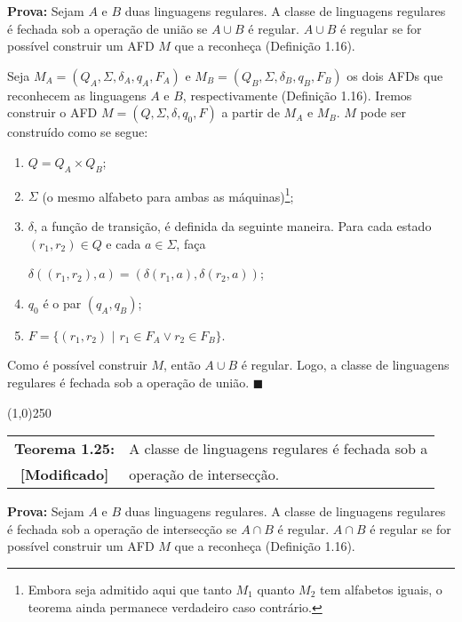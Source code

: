 \documentclass[12pt,a4paper,oneside]{article}
\begin{document}
{\bf Prova:} Sejam $A$ e $B$ duas linguagens regulares. A classe de linguagens regulares é fechada sob a operação de união se $A \cup B$ é regular. $A \cup B$ é regular se for possível construir um AFD $M$ que a reconheça (Definição 1.16).

Seja $M_A = ( Q_A, \Sigma, \delta_A, q_A, F_A )$ e $M_B = ( Q_B, \Sigma, \delta_B, q_B, F_B )$ os dois AFDs que reconhecem as linguagens $A$ e $B$, respectivamente (Definição 1.16). Iremos construir o AFD $M = ( Q, \Sigma, \delta, q_0, F )$ a partir de $M_A$ e $M_B$. $M$ pode ser construído como se segue:

\begin{enumerate}
	\item $Q = Q_A \times Q_B$;
	\item $\Sigma$ (o mesmo alfabeto para ambas as máquinas)\footnote{Embora seja admitido aqui que tanto $M_1$ quanto $M_2$ tem alfabetos iguais, o teorema ainda permanece verdadeiro caso contrário.};
	\item $\delta$, a função de transição, é definida da seguinte maneira. Para cada estado $(r_1,r_2) \in Q$ e cada $a \in \Sigma$, faça
		\begin{center}
			$\delta( (r_1, r_2), a ) = (\delta(r_1,a), \delta(r_2,a)) $;
		\end{center}
	\item $q_0$ é o par $(q_A, q_B)$;
	\item $F = \{ (r_1, r_2) \mbox{ | } r_1 \in F_A \vee r_2 \in F_B \}$.
\end{enumerate}

Como é possível construir $M$, então $A \cup B$ é regular. Logo, a classe de linguagens regulares é fechada sob a operação de união. $\blacksquare$

\begin{center}
\line(1,0){250}
\end{center}

\begin{flushleft}
	\begin{tabular}{cl}
		{\bf Teorema 1.25:} & A classe de linguagens regulares é fechada sob a \\
		{\bf [Modificado]}	& operação de intersecção.
	\end{tabular}
\end{flushleft}

{\bf Prova:} Sejam $A$ e $B$ duas linguagens regulares. A classe de linguagens regulares é fechada sob a operação de intersecção se $A \cap B$ é regular. $A \cap B$ é regular se for possível construir um AFD $M$ que a reconheça (Definição 1.16).
\end{document}
